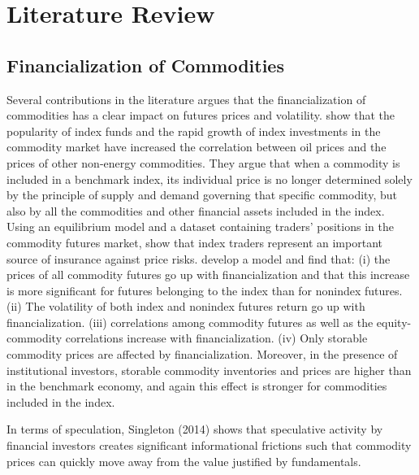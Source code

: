 \documentclass[12pt]{article}
\begin{document}
\section{Literature Review}

\subsection{Financialization of Commodities}

Several contributions in the literature argues that the financialization of commodities has a clear impact on futures prices and volatility. \citet{tang2012index} show that the popularity of index funds and the rapid growth of index investments in the commodity market have increased the correlation between oil prices and the prices of other non-energy commodities. They argue that when a commodity is included in a benchmark index, its individual price is no longer determined solely by the principle of supply and demand governing that specific commodity, but also by all the commodities and other financial assets included in the index. Using an equilibrium model and a dataset containing traders’ positions in the commodity futures market, \citet{brunetti2014commodity} show that index traders represent an important source of insurance against price risks.\citet{basak2016model} develop a model and find that: (i) the prices of all commodity futures go up with financialization and that this increase is more significant for futures belonging to the index than for nonindex futures. (ii) The volatility of both index and nonindex futures return go up with financialization. (iii) correlations among commodity futures as well as the equity-commodity correlations increase with financialization. (iv) Only storable commodity prices are affected by financialization. Moreover, in the presence of institutional investors, storable commodity inventories and prices are higher than in the benchmark economy, and again this effect is stronger for commodities included in the index.


In terms of speculation, Singleton (2014) shows that speculative activity by financial investors creates significant informational frictions such that commodity prices can quickly move away from the value justified by fundamentals. 
\end{document}
